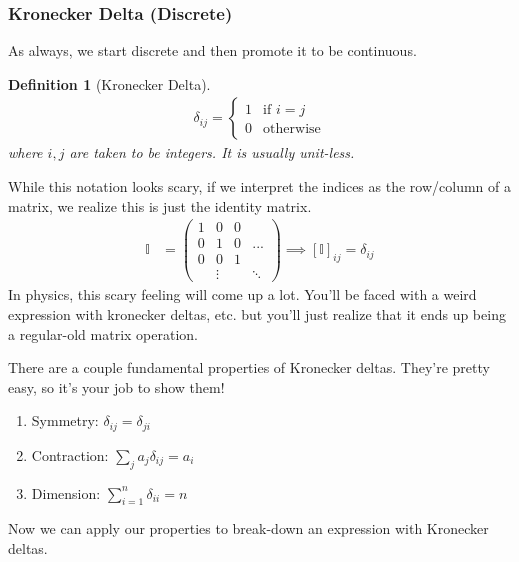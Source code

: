 \documentclass[12pt,fleqn]{article}
\numberwithin{equation}{section} %
\newtheorem{definition}{Definition}
\newcounter{problem}
\begin{document}
\subsubsection{Kronecker Delta (Discrete)}
As always, we start discrete and then promote it to be continuous.
\begin{definition}
	[Kronecker Delta]
	\begin{align}
		\delta_{ij} = \begin{cases}
			1 & \text{if } i = j\\
			0 & \text{otherwise}
		\end{cases}
	\end{align}
	where $i,j$ are taken to be integers. It is usually unit-less.
\end{definition}
While this notation looks scary, if we interpret the indices as the row/column of a matrix, we realize this is just the identity matrix.
\begin{align}
	\mathbb I & = \begin{pmatrix}
		1 & 0 & 0 & \\
		0 & 1 & 0 & ...\\
		0 & 0 & 1 & \\
	  	  & \vdots & & \ddots
	\end{pmatrix} \implies [\mathbb I]_{ij}  = \delta_{ij}
\end{align}
In physics, this scary feeling will come up a lot. You'll be faced with a weird expression with kronecker deltas, etc. but you'll just realize that it ends up being a regular-old matrix operation. 
\begin{problem} There are a couple fundamental properties of Kronecker deltas. They're pretty easy, so it's your job to show them!
	\begin{enumerate}
		\item Symmetry: $\delta_{ij} = \delta_{ji}$
		\item Contraction: $\sum_j a_j \delta_{ij} = a_i$
		\item Dimension: $\sum_{i=1}^n \delta_{ii} = n$
	\end{enumerate}
\end{problem}
Now we can apply our properties to break-down an expression with Kronecker deltas.
\end{document}
